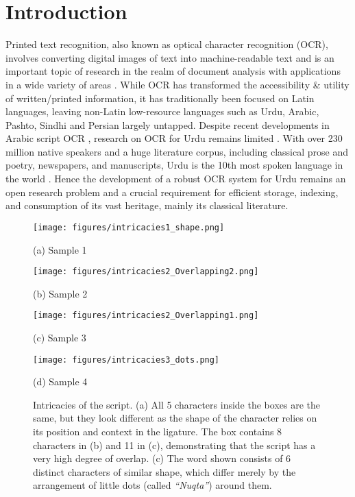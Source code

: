 \documentclass[runningheads]{llncs}
\begin{document}
\section{Introduction}
\label{section:intro_section}

Printed text recognition, also known as optical character recognition (OCR), involves converting digital images of text into machine-readable text and is an important topic of research in the realm of document analysis with applications in a wide variety of areas \cite{ocrapplications1}. While OCR has transformed the accessibility \& utility of written/printed information, it has traditionally been focused on Latin languages, leaving non-Latin low-resource languages such as Urdu, Arabic, Pashto, Sindhi and Persian largely untapped. Despite recent developments in Arabic script OCR \cite{surveyArabicOCR,7926062,surveyArabicOCR_2023}, research on OCR for Urdu remains limited \cite{surveyurdu1,surveyurdu2,surveyurdu3}. With over 230 million native speakers and a huge literature corpus, including classical prose and poetry, newspapers, and manuscripts, Urdu is the 10th most spoken language in the world \cite{Mushtaq2021-cn,iiith17urdu}. Hence the development of a robust OCR system for Urdu remains an open research problem and a crucial requirement for efficient storage, indexing, and consumption of its vast heritage, mainly its classical literature.

\begin{figure}[t]
	\begin{minipage}[b]{\textwidth}
		\centering
		\centerline{\texttt{[image: figures/intricacies1\_shape.png]}}
\centerline{(a) Sample 1}\medskip
	\end{minipage}
\begin{minipage}[b]{.35\textwidth}
		\centering
		\centerline{\texttt{[image: figures/intricacies2\_Overlapping2.png]}}
\centerline{(b) Sample 2}\medskip
	\end{minipage}
	\hfill
	\begin{minipage}[b]{.3\textwidth}
		\centering
		\centerline{\texttt{[image: figures/intricacies2\_Overlapping1.png]}}
\centerline{(c) Sample 3}\medskip
	\end{minipage}
	\hfill
	\begin{minipage}[b]{.325\textwidth}
		\centering
		\centerline{\texttt{[image: figures/intricacies3\_dots.png]}}
\centerline{(d) Sample 4}\medskip
	\end{minipage}
\caption{Intricacies of the script. (a) All 5 characters inside the boxes are the same, but they look different as the shape of the character relies on its position and context in the ligature. The box contains 8 characters in (b) and 11 in (c), demonstrating that the script has a very high degree of overlap. (c) The word shown consists of 6 distinct characters of similar shape, which differ merely by the arrangement of little dots (called \textit{``Nuqta''}) around them.}
	\label{fig:intricacies}
\end{figure}
\end{document}
